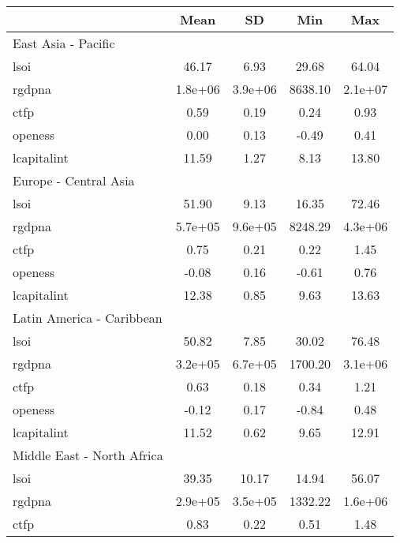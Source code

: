 {
\def\sym#1{\ifmmode^{#1}\else\(^{#1}\)\fi}
\begin{tabular}{l*{1}{cccc}}
\hline\hline
            &        Mean&          SD&         Min&         Max\\
\hline
East Asia - Pacific&            &            &            &            \\
lsoi        &       46.17&        6.93&       29.68&       64.04\\
rgdpna      &     1.8e+06&     3.9e+06&     8638.10&     2.1e+07\\
ctfp        &        0.59&        0.19&        0.24&        0.93\\
openess     &        0.00&        0.13&       -0.49&        0.41\\
lcapitalint &       11.59&        1.27&        8.13&       13.80\\
\hline
Europe - Central Asia&            &            &            &            \\
lsoi        &       51.90&        9.13&       16.35&       72.46\\
rgdpna      &     5.7e+05&     9.6e+05&     8248.29&     4.3e+06\\
ctfp        &        0.75&        0.21&        0.22&        1.45\\
openess     &       -0.08&        0.16&       -0.61&        0.76\\
lcapitalint &       12.38&        0.85&        9.63&       13.63\\
\hline
Latin America - Caribbean&            &            &            &            \\
lsoi        &       50.82&        7.85&       30.02&       76.48\\
rgdpna      &     3.2e+05&     6.7e+05&     1700.20&     3.1e+06\\
ctfp        &        0.63&        0.18&        0.34&        1.21\\
openess     &       -0.12&        0.17&       -0.84&        0.48\\
lcapitalint &       11.52&        0.62&        9.65&       12.91\\
\hline
Middle East - North Africa&            &            &            &            \\
lsoi        &       39.35&       10.17&       14.94&       56.07\\
rgdpna      &     2.9e+05&     3.5e+05&     1332.22&     1.6e+06\\
ctfp        &        0.83&        0.22&        0.51&        1.48\\

\end{tabular}}
